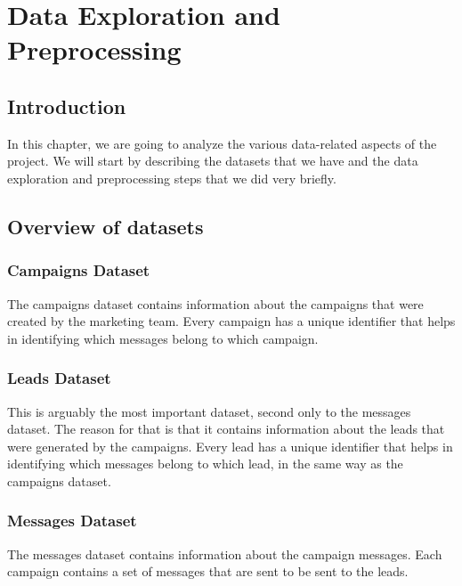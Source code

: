 \chapter{Data Exploration and Preprocessing}
\minitoc
\newpage

\setcounter{secnumdepth}{0} %
\section{Introduction}
In this chapter, we are going to analyze the various data-related aspects of the project.
We will start by describing the datasets that we have and the data exploration and preprocessing steps that we did very briefly.

\setcounter{secnumdepth}{2} %
\section{Overview of datasets}

\subsection{Campaigns Dataset}
The campaigns dataset contains information about the campaigns that were created by the marketing team.
Every campaign has a unique identifier that helps in identifying which messages belong to which campaign.

\subsection{Leads Dataset}
This is arguably the most important dataset, second only to the messages dataset. The reason for that is that it contains information about the leads that were generated by the campaigns.
Every lead has a unique identifier that helps in identifying which messages belong to which lead, in the same way as the campaigns dataset.

\subsection{Messages Dataset}
The messages dataset contains information about the campaign messages.
Each campaign contains a set of messages that are sent to be sent to the leads.

